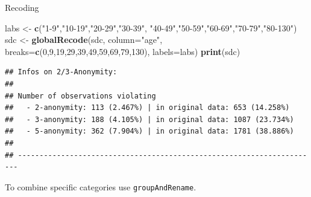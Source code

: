 \documentclass[ignorenonframetext,]{beamer}
\newenvironment{Shaded}{\begin{snugshade}}{\end{snugshade}}
\newcommand{\DataTypeTok}[1]{\textcolor[rgb]{0.13,0.29,0.53}{#1}}
\newcommand{\DecValTok}[1]{\textcolor[rgb]{0.00,0.00,0.81}{#1}}
\newcommand{\KeywordTok}[1]{\textcolor[rgb]{0.13,0.29,0.53}{\textbf{#1}}}
\newcommand{\NormalTok}[1]{#1}
\newcommand{\StringTok}[1]{\textcolor[rgb]{0.31,0.60,0.02}{#1}}
\begin{document}
\begin{frame}[fragile]{Recoding}
\protect\hypertarget{recoding-2}{}

\begin{Shaded}
\begin{Highlighting}[]
\NormalTok{labs <-}\StringTok{ }\KeywordTok{c}\NormalTok{(}\StringTok{"1-9"}\NormalTok{,}\StringTok{"10-19"}\NormalTok{,}\StringTok{"20-29"}\NormalTok{,}\StringTok{"30-39"}\NormalTok{,}
          \StringTok{"40-49"}\NormalTok{,}\StringTok{"50-59"}\NormalTok{,}\StringTok{"60-69"}\NormalTok{,}\StringTok{"70-79"}\NormalTok{,}\StringTok{"80-130"}\NormalTok{)}
\NormalTok{sdc <-}\StringTok{ }\KeywordTok{globalRecode}\NormalTok{(sdc, }\DataTypeTok{column=}\StringTok{"age"}\NormalTok{,}
                    \DataTypeTok{breaks=}\KeywordTok{c}\NormalTok{(}\DecValTok{0}\NormalTok{,}\DecValTok{9}\NormalTok{,}\DecValTok{19}\NormalTok{,}\DecValTok{29}\NormalTok{,}\DecValTok{39}\NormalTok{,}\DecValTok{49}\NormalTok{,}\DecValTok{59}\NormalTok{,}\DecValTok{69}\NormalTok{,}\DecValTok{79}\NormalTok{,}\DecValTok{130}\NormalTok{), }
                    \DataTypeTok{labels=}\NormalTok{labs)}
\KeywordTok{print}\NormalTok{(sdc)}
\end{Highlighting}
\end{Shaded}

\begin{verbatim}
## Infos on 2/3-Anonymity:
## 
## Number of observations violating
##   - 2-anonymity: 113 (2.467%) | in original data: 653 (14.258%)
##   - 3-anonymity: 188 (4.105%) | in original data: 1087 (23.734%)
##   - 5-anonymity: 362 (7.904%) | in original data: 1781 (38.886%)
## 
## ----------------------------------------------------------------------
\end{verbatim}

To combine specific categories use \texttt{groupAndRename}.

\end{frame}
\end{document}
